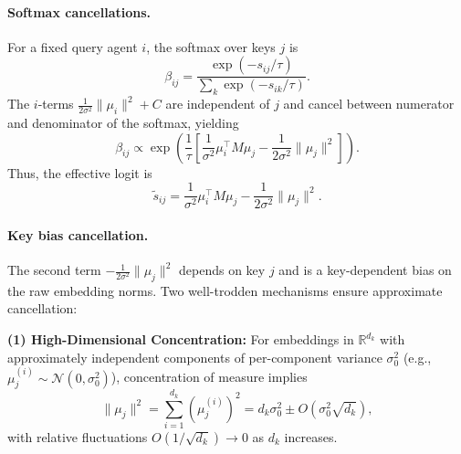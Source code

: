 \documentclass[11pt]{article}
\begin{document}
\paragraph{Softmax cancellations.}
For a fixed query agent $i$, the softmax over keys $j$ is
\begin{equation}
\beta_{ij} = \frac{\exp(-s_{ij}/\tau)}{\sum_k \exp(-s_{ik}/\tau)}.
\end{equation}
The $i$-terms $\frac{1}{2\sigma^2}\|\mu_i\|^2 + C$ are independent of $j$ and cancel between numerator and denominator of the softmax, yielding
\begin{equation}
\beta_{ij} \propto \exp\left(\frac{1}{\tau}\left[\frac{1}{\sigma^2}\mu_i^\top M \mu_j - \frac{1}{2\sigma^2}\|\mu_j\|^2\right]\right).
\end{equation}
Thus, the effective logit is
\begin{equation}
\tilde{s}_{ij} = \frac{1}{\sigma^2}\mu_i^\top M \mu_j - \frac{1}{2\sigma^2}\|\mu_j\|^2.
\end{equation}

\paragraph{Key bias cancellation.}
The second term $-\frac{1}{2\sigma^2}\|\mu_j\|^2$ depends on key $j$ and is a key-dependent bias on the raw embedding norms. Two well-trodden mechanisms ensure approximate cancellation:

\textbf{(1) High-Dimensional Concentration:}
For embeddings in $\mathbb{R}^{d_k}$ with approximately independent components of per-component variance $\sigma_0^2$ (e.g., $\mu_j^{(i)} \sim \mathcal{N}(0, \sigma_0^2)$), concentration of measure implies
\begin{equation}
\|\mu_j\|^2 = \sum_{i=1}^{d_k} (\mu_j^{(i)})^2 = d_k\sigma_0^2 \pm O(\sigma_0^2\sqrt{d_k}),
\end{equation}
with relative fluctuations $O(1/\sqrt{d_k}) \to 0$ as $d_k$ increases.
\end{document}
